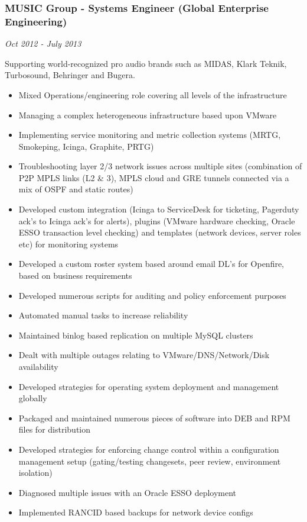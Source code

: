 \subsubsection{MUSIC Group - Systems Engineer (Global Enterprise
Engineering)}

\emph{Oct 2012 - July 2013}

Supporting world-recognized pro audio brands such as MIDAS, Klark
Teknik, Turbosound, Behringer and Bugera.

\begin{itemize}
\item
  Mixed Operations/engineering role covering all levels of the
  infrastructure
\item
  Managing a complex heterogeneous infrastructure based upon VMware
\item
  Implementing service monitoring and metric collection systems (MRTG,
  Smokeping, Icinga, Graphite, PRTG)
\item
  Troubleshooting layer 2/3 network issues across multiple sites
  (combination of P2P MPLS links (L2 \& 3), MPLS cloud and GRE tunnels
  connected via a mix of OSPF and static routes)
\item
  Developed custom integration (Icinga to ServiceDesk for ticketing,
  Pagerduty ack's to Icinga ack's for alerts), plugins (VMware hardware
  checking, Oracle ESSO transaction level checking) and templates
  (network devices, server roles etc) for monitoring systems
\item
  Developed a custom roster system based around email DL's for Openfire,
  based on business requirements
\item
  Developed numerous scripts for auditing and policy enforcement
  purposes
\item
  Automated manual tasks to increase reliability
\item
  Maintained binlog based replication on multiple MySQL clusters
\item
  Dealt with multiple outages relating to VMware/DNS/Network/Disk
  availability
\item
  Developed strategies for operating system deployment and management
  globally
\item
  Packaged and maintained numerous pieces of software into DEB and RPM
  files for distribution
\item
  Developed strategies for enforcing change control within a
  configuration management setup (gating/testing changesets, peer
  review, environment isolation)
\item
  Diagnosed multiple issues with an Oracle ESSO deployment
\item
  Implemented RANCID based backups for network device configs
\end{itemize}

